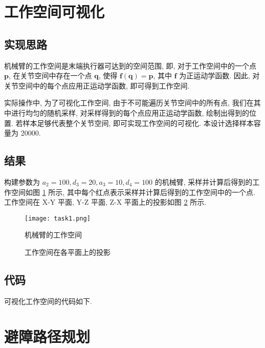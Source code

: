 \documentclass{article}
\begin{document}
\section{工作空间可视化}
\subsection{实现思路}
机械臂的工作空间是末端执行器可达到的空间范围, 即, 对于工作空间中的一个点 $\mathbf{p}$, 在关节空间中存在一个点 $\mathbf{q}$, 使得 $\mathbf{f}(\mathbf{q}) = \mathbf{p}$, 其中 $\mathbf{f}$ 为正运动学函数. 因此, 对关节空间中的每个点应用正运动学函数, 即可得到工作空间.\par
实际操作中, 为了可视化工作空间, 由于不可能遍历关节空间中的所有点, 我们在其中进行均匀的随机采样, 对采样得到的每个点应用正运动学函数, 绘制出得到的位置. 若样本足够代表整个关节空间, 即可实现工作空间的可视化. 本设计选择样本容量为 20000.


\subsection{结果}
构建参数为 $a_2=100, d_3=20, a_3=10, d_4=100$ 的机械臂, 采样并计算后得到的工作空间如图 \ref{workspace} 所示, 其中每个红点表示采样并计算后得到的工作空间中的一个点. 工作空间在 X-Y 平面, Y-Z 平面, Z-X 平面上的投影如图 \ref{projection} 所示.
\medskip
\begin{figure}[H]
    \centering
    \texttt{[image: task1.png]}
    \caption{机械臂的工作空间}
    \label{workspace}
\end{figure}
\medskip

\begin{figure}[H]
    \centering
    \hspace{3pt}
    \hspace{3pt}
    \caption{\label{projection}工作空间在各平面上的投影}
\end{figure}
\medskip

\subsection{代码}
可视化工作空间的代码如下.
\medskip



\section{避障路径规划}
\end{document}
